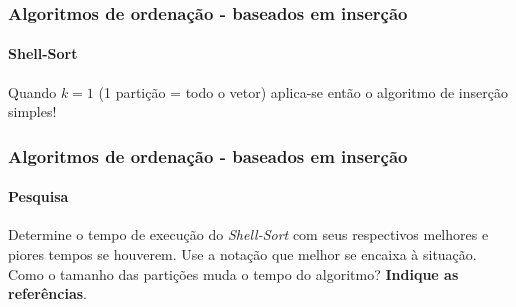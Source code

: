 \begin{frame}
	\frametitle{Algoritmos de ordenação - baseados em inserção}
	\framesubtitle{Shell-Sort}
	
	\par Quando $k=1$ (1 partição = todo o vetor) aplica-se então o algoritmo de inserção simples! 
	
\end{frame}

\begin{frame}
	\frametitle{Algoritmos de ordenação - baseados em inserção}
	\framesubtitle{Pesquisa}
	\par Determine o tempo de execução do \textit{Shell-Sort} com seus respectivos melhores e piores tempos se houverem. Use a notação que melhor se encaixa à situação. Como o tamanho das partições muda o tempo do algoritmo? \textbf{Indique as referências}.
\end{frame}

